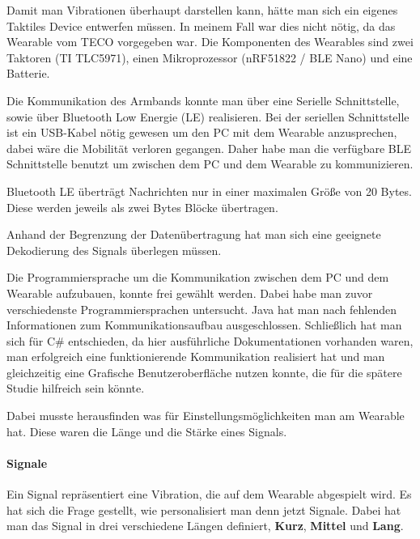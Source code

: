 Damit man Vibrationen {\"u}berhaupt darstellen kann, h{\"a}tte man sich ein eigenes Taktiles Device entwerfen m{\"u}ssen. In meinem Fall war dies nicht n{\"o}tig, da das Wearable vom TECO vorgegeben war. Die Komponenten des Wearables sind zwei Taktoren (TI TLC5971), einen Mikroprozessor (nRF51822 / BLE Nano) und eine Batterie.

Die Kommunikation des Armbands konnte man {\"u}ber eine Serielle Schnittstelle, sowie {\"u}ber Bluetooth Low Energie (LE) realisieren.
Bei der seriellen Schnittstelle ist ein USB-Kabel n{\"o}tig gewesen um den PC mit dem Wearable anzusprechen, dabei w{\"a}re die Mobilit{\"a}t verloren gegangen. Daher habe man die verf{\"u}gbare BLE Schnittstelle benutzt um zwischen dem PC und dem Wearable zu kommunizieren. 

Bluetooth LE {\"u}bertr{\"a}gt Nachrichten nur in einer maximalen Gr{\"o}{\ss}e von 20 Bytes. Diese werden jeweils als zwei Bytes Bl{\"o}cke {\"u}bertragen. 

Anhand der Begrenzung der Daten{\"u}bertragung hat man sich eine geeignete Dekodierung des Signals {\"u}berlegen m{\"u}ssen. 

Die Programmiersprache um die Kommunikation zwischen dem PC und dem Wearable aufzubauen, konnte frei gew{\"a}hlt werden. 
Dabei habe man zuvor verschiedenste Programmiersprachen untersucht. 
Java hat man nach fehlenden Informationen zum Kommunikationsaufbau ausgeschlossen.
Schlie{\ss}lich hat man sich f{\"u}r C\# entschieden, da hier ausf{\"u}hrliche Dokumentationen vorhanden waren, man erfolgreich eine funktionierende Kommunikation realisiert hat und man gleichzeitig eine Grafische Benutzeroberfl{\"a}che nutzen konnte, die f{\"u}r die sp{\"a}tere Studie hilfreich sein k{\"o}nnte.

Dabei musste herausfinden was f{\"u}r Einstellungsm{\"o}glichkeiten man am Wearable hat. Diese waren die L{\"a}nge und die St{\"a}rke eines Signals.

\paragraph{Signale}

Ein Signal repr{\"a}sentiert eine Vibration, die auf dem Wearable abgespielt wird. Es hat sich die Frage gestellt, wie personalisiert man denn jetzt Signale. Dabei hat man das Signal in drei verschiedene L{\"a}ngen definiert, \textbf{Kurz}, \textbf{Mittel} und \textbf{Lang}. 

